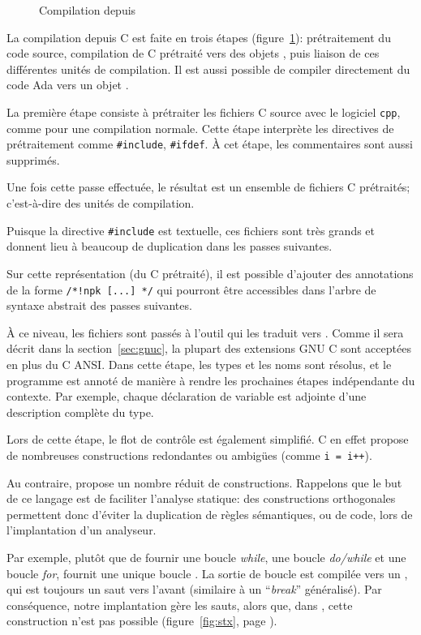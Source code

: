 \begin{figure}
  \centering
  
  \caption{Compilation depuis \newspeak}
\label{fig:compil-npk}
\end{figure}

La compilation depuis C est faite en trois étapes (figure~\ref{fig:compil-npk}):
prétraitement du code source, compilation de C prétraité vers des objets
\newspeak{}, puis liaison de ces différentes unités de compilation. Il est aussi
possible de compiler directement du code Ada vers un objet \newspeak{}.

La première étape consiste à prétraiter les fichiers C source avec le logiciel
\texttt{cpp}, comme pour une compilation normale. Cette étape interprète les
directives de prétraitement comme \texttt{\#include}, \texttt{\#ifdef}. À cet
étape, les commentaires sont aussi supprimés.

Une fois cette passe effectuée, le résultat est un ensemble de fichiers C
prétraités; c'est-à-dire des unités de compilation.

Puisque la directive \texttt{\#include} est textuelle, ces fichiers sont très
grands et donnent lieu à beaucoup de duplication dans les passes suivantes.

Sur cette représentation (du C prétraité), il est possible d'ajouter des
annotations de la forme \texttt{/*!npk [...] */} qui pourront être accessibles
dans l'arbre de syntaxe abstrait des passes suivantes.

À ce niveau, les fichiers sont passés à l'outil \ctonewspeak qui les
traduit vers \newspeak. Comme il sera décrit dans la section~\ref{sec:gnuc}, la
plupart des extensions GNU C sont acceptées en plus du C ANSI. Dans cette étape,
les types et les noms sont résolus, et le programme est annoté de manière à
rendre les prochaines étapes indépendante du contexte. Par exemple, chaque
déclaration de variable est adjointe d'une description complète du type.

Lors de cette étape, le flot de contrôle est également simplifié. C en effet
propose de nombreuses constructions redondantes ou ambigües
(comme \texttt{i = i++}).

Au contraire, \newspeak propose un nombre réduit de constructions. Rappelons que
le but de ce langage est de faciliter l'analyse statique: des constructions
orthogonales permettent donc d'éviter la duplication de règles sémantiques, ou
de code, lors de l'implantation d'un analyseur.

Par exemple, plutôt que de fournir une boucle \emph{while}, une boucle
\emph{do/while} et une boucle \emph{for}, \newspeak fournit une unique boucle
\phx\npkWhile. La sortie de boucle est compilée vers un \npkGoto{}\cite{goto},
qui est toujours un saut vers l'avant (similaire à un \enquote{\emph{break}}
généralisé). Par conséquence, notre implantation gère les sauts, alors que, dans
\langname, cette construction n'est pas possible (figure~\ref{fig:stx}, page
\pageref{fig:stx}).

